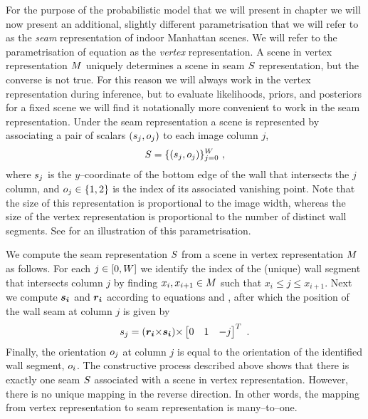 For the purpose of the probabilistic model that we will present in
chapter  we will now present an additional, slightly
different parametrisation that we will refer to as the \textit{seam}
representation of indoor Manhattan scenes. We will refer to the
parametrisation of equation  as the
\textit{vertex} representation. A scene in vertex representation
$\Scene$ uniquely determines a scene in seam $\Seam$ representation,
but the converse is not true. For this reason we will always work in
the vertex representation during inference, but to evaluate
likelihoods, priors, and posteriors for a fixed scene we will find it
notationally more convenient to work in the seam representation. Under
the seam representation a scene is represented by associating a pair of
scalars $(\seam_j,\WallOrient_j)$ to each image column $j$,
\begin{equation}
  \label{eq:seam-def}
  \Seam = \{(\seam_j,\WallOrient_j)\}_{j=0}^\Width  ~,
\end{equation}
where $\seam_j$ is the $y$--coordinate of the bottom edge of the wall
that intersects the $j$\th column, and $\WallOrient_j\in\{1,2\}$ is
the index of its associated vanishing point. Note that the size of
this representation is proportional to the image width, whereas the
size of the vertex representation is proportional to the number of
distinct wall segments. See 
for an illustration of this parametrisation.

We compute the seam representation $\Seam$ from a scene in vertex
representation $\Scene$ as follows. For each $j\in[0,\Width]$ we
identify the index of the (unique) wall segment that intersects column
$j$ by finding $x_i,x_{i+1}\in\Scene$ such that $x_i \leq j \leq
x_{i+1}$. Next we compute $\vect{s_i}$ and $\vect{r_i}$ according to
equations  and , after which the position of the
wall seam at column $j$ is given by
\begin{equation}
  \label{eq:seam-from-scene}
  \seam_j = (\vect{r_i} \cross \vect{s_i}) \cross
  \begin{bmatrix} 0 & 1 & -j \end{bmatrix}^T ~.
\end{equation}
Finally, the orientation $\WallOrient_j$ at column $j$ is equal to the
orientation of the identified wall segment, $\WallOrient_i$. The
constructive process described above shows that there is exactly one
seam $\Seam$ associated with a scene in vertex
representation. However, there is no unique mapping in the reverse
direction. In other words, the mapping from vertex representation to
seam representation is many--to--one.

